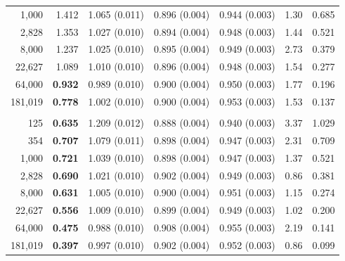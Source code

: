 \begin{tabular}{rrcccrr}
1,000 & 1.412 & 1.065 (0.011) & 0.896 (0.004) & 0.944 (0.003) & 1.30 & 0.685 \\
2,828 & 1.353 & 1.027 (0.010) & 0.894 (0.004) & 0.948 (0.003) & 1.44 & 0.521 \\
8,000 & 1.237 & 1.025 (0.010) & 0.895 (0.004) & 0.949 (0.003) & 2.73 & 0.379 \\
22,627 & 1.089 & 1.010 (0.010) & 0.896 (0.004) & 0.948 (0.003) & 1.54 & 0.277 \\
64,000 & \textbf{0.932} & 0.989 (0.010) & 0.900 (0.004) & 0.950 (0.003) & 1.77 & 0.196 \\
181,019 & \textbf{0.778} & 1.002 (0.010) & 0.900 (0.004) & 0.953 (0.003) & 1.53 & 0.137 \\
\addlinespace
\multicolumn{7}{l}{\textit{Panel F: DGP-HB, $c_\delta=0.25$, $B=5,000$}} \\
\midrule
125 & \textbf{0.635} & 1.209 (0.012) & 0.888 (0.004) & 0.940 (0.003) & 3.37 & 1.029 \\
354 & \textbf{0.707} & 1.079 (0.011) & 0.898 (0.004) & 0.947 (0.003) & 2.31 & 0.709 \\
1,000 & \textbf{0.721} & 1.039 (0.010) & 0.898 (0.004) & 0.947 (0.003) & 1.37 & 0.521 \\
2,828 & \textbf{0.690} & 1.021 (0.010) & 0.902 (0.004) & 0.949 (0.003) & 0.86 & 0.381 \\
8,000 & \textbf{0.631} & 1.005 (0.010) & 0.900 (0.004) & 0.951 (0.003) & 1.15 & 0.274 \\
22,627 & \textbf{0.556} & 1.009 (0.010) & 0.899 (0.004) & 0.949 (0.003) & 1.02 & 0.200 \\
64,000 & \textbf{0.475} & 0.988 (0.010) & 0.908 (0.004) & 0.955 (0.003) & 2.19 & 0.141 \\
181,019 & \textbf{0.397} & 0.997 (0.010) & 0.902 (0.004) & 0.952 (0.003) & 0.86 & 0.099 \\
\bottomrule
\end{tabular}
